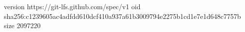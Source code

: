 version https://git-lfs.github.com/spec/v1
oid sha256:c1239605ac4adfdd610dcf410a937a61b3009794e2275b1cd1e7e1d648c7757b
size 2097220

